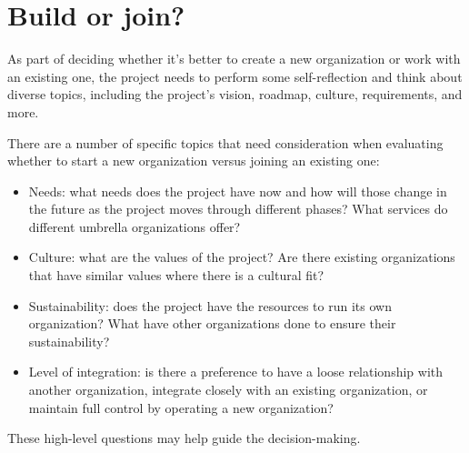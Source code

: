 


\chapter{Build or join?}

As part of deciding whether it's better to create a new organization or work with an existing one, the project needs to perform some self-reflection and think about diverse topics, including the project's vision, roadmap, culture, requirements, and more.

There are a number of specific topics that need consideration when evaluating whether to start a new organization versus joining an existing one:

\begin{itemize}

\itemsep 0.50em

\item Needs: what needs does the project have now and how will those change in the future as the project moves through different phases?  What services do different umbrella organizations offer?

\item Culture: what are the values of the project?  Are there existing organizations that have similar values where there is a cultural fit?

\item Sustainability: does the project have the resources to run its own organization?  What have other organizations done to ensure their sustainability?

\item Level of integration: is there a preference to have a loose relationship with another organization, integrate closely with an existing organization, or maintain full control by operating a new organization?

\end{itemize}

These high-level questions may help guide the decision-making.

